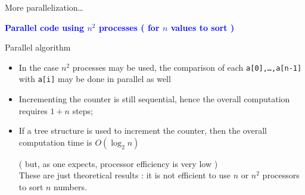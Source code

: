 \documentclass[compress,10pt,aspectratio=169]{beamer}
\begin{document}
\begin{frame}[fragile]{More parallelization\ldots}
  \scriptsize
  \begin{center}
    \textcolor{blue}{\bf Parallel code using $n^{2}$ processes ( for $n$ values to sort )}
  \end{center}
  \begin{block}{Parallel algorithm}
    \begin{itemize}
    \item In the case $n^{2}$ processes may be used, the comparison of each
      \texttt{a[0],\ldots,a[n-1]} with \texttt{a[i]} may be done in parallel as well
    \item Incrementing the counter is still sequential, hence the overall computation requires $1+n$ steps;
    \item If a tree structure is used to increment the counter, then the overall
      computation time is $O(\log_{2} n)$
      \begin{multicols}{2}
        
      \begin{minipage}{0.4\textwidth}
      \end{minipage}

      ( but, as one expects, processor efficiency
      is very low )\\[2mm]
      These are just theoretical results : it is not efficient to use $n$ or $n^{2}$
      processors to sort $n$ numbers.
      \end{multicols}
      
      \end{itemize}
  \end{block}
\end{frame}
\end{document}
